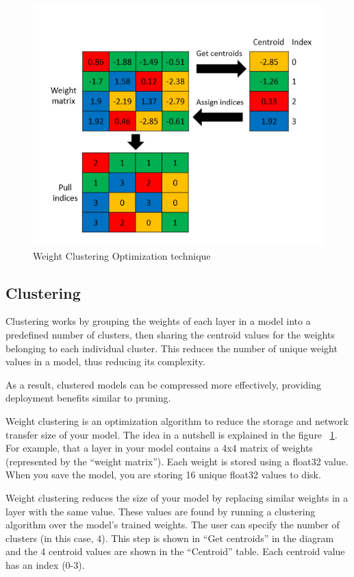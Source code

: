 \begin{figure}
	\begin{center}
		\includegraphics[width=0.7\linewidth]{Images/TensorFlowLite/Clustering.png}
		\caption{Weight Clustering Optimization technique}
		\label{Clustering}
	\end{center}
\end{figure}

\subsection{Clustering}
Clustering works by grouping the weights of each layer in a model into a predefined number of clusters, then sharing the centroid values for the weights belonging to each individual cluster. This reduces the number of unique weight values in a model, thus reducing its complexity. \cite{tfl_Opt:2024}

As a result, clustered models can be compressed more effectively, providing deployment benefits similar to pruning.


Weight clustering is an optimization algorithm to reduce the storage and network transfer size of your model. The idea in a nutshell is explained in the figure ~\ref{Clustering}. For example, that a layer in your model contains a 4x4 matrix of weights (represented by the “weight matrix”). Each weight is stored using a float32 value. When you save the model, you are storing 16 unique float32 values to disk.

Weight clustering reduces the size of your model by replacing similar weights in a layer with the same value. These values are found by running a clustering algorithm over the model’s trained weights. The user can specify the number of clusters (in this case, 4). This step is shown in “Get centroids” in the diagram and the 4 centroid values are shown in the “Centroid” table. Each centroid value has an index (0-3).

